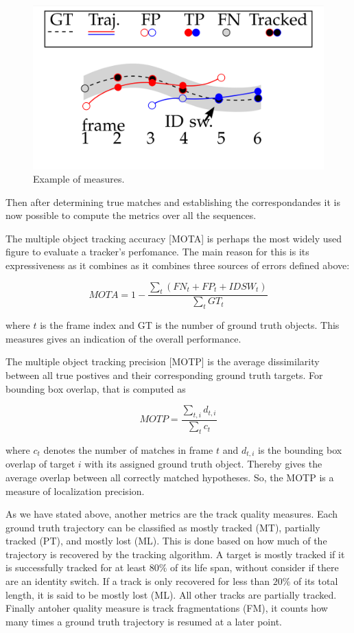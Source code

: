\documentclass[12pt, a4paper, titlepage,twoside,openright]{article}
\begin{document}
\begin{figure}[H]
\centering         
\includegraphics[width=0.7\linewidth]{datasetTracking/trackins.png}
\caption{Example of measures.} \label{petsExample}
\end{figure}

Then after determining true matches and establishing the correspondandes it is now possible to compute the metrics over all the sequences.


The multiple object tracking accuracy [MOTA] \cite{clear} is perhaps the most widely used figure to evaluate a tracker's perfomance. The main reason for this is its expressiveness as it combines as it combines three sources of errors defined above:

$$ MOTA = 1 - \frac{\sum_{t} (FN_{t}+FP_{t}+IDSW_{t})}{ \sum_{t} GT_{t}}$$

where $t$ is the frame index and GT is the number of ground truth objects. This measures gives an indication of the overall performance.

The multiple object tracking precision [MOTP] is the average dissimilarity between all true postives and their corresponding ground truth targets. For bounding box overlap, that is computed as 

$$ MOTP =  \frac{\sum _{t,i} d_{t,i}}{ \sum_{t} c_{t}} $$

where $c_{t}$ denotes the number of matches in frame $t$ and $d_{t,i}$ is the bounding box overlap of target $i$ with its assigned ground truth object. Thereby gives the average overlap between all correctly matched hypotheses. So, the MOTP is a measure of localization precision.


As we have stated above, another metrics are the track quality measures. Each ground truth trajectory can be classified as mostly tracked (MT), partially tracked (PT), and mostly lost (ML). This is done based on how much of the trajectory is recovered by the tracking algorithm. A target is mostly tracked if it is successfully tracked for at least $80 \%$ of its life span, without consider if there are an identity switch. If a track is only recovered for less than $20 \%$ of its total length, it is said to be mostly lost (ML). All other tracks are partially tracked. Finally antoher quality measure is track fragmentations (FM), it counts how many times a ground truth trajectory is resumed at a later point.
\end{document}

